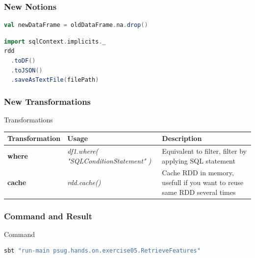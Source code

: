 \documentclass[slidetop,9pt,utf8]{beamer}
\begin{document}
\begin{CJK}{UTF8}{gbsn}
\begin{frame}[fragile]
\end{frame}

\begin{frame}[fragile]
  \frametitle{New Notions}

  \begin{lstlisting}[label=DropNullValue, caption=Drop rows containing null values, language=scala, style=code]
val newDataFrame = oldDataFrame.na.drop()
  \end{lstlisting}

  \begin{lstlisting}[label=SaveJsonFile, caption=Save RDD to JSON File, language=scala, style=code]
import sqlContext.implicits._
rdd
  .toDF()
  .toJSON()
  .saveAsTextFile(filePath)
  \end{lstlisting}

\end{frame}

\begin{frame}

  \frametitle{New Transformations}

  \begin{block}{Transformations}
    \begin{center}
      \begin{tabular}{|m{2.1cm}|m{3.5cm}|m{5cm}|}
        \hline 
        \rowcolor{gray} \textbf{Transformation} & \textbf{Usage} & \textbf{Description} \\ \hline
        \textbf{where} & \textit{df1.where( \newline  "SQLConditionStatement" \newline )} & Equivalent to filter, filter by applying SQL statement \\ \hline
        \textbf{cache} & \textit{rdd.cache()} & Cache RDD in memory, usefull if you want to reuse same RDD several times \\ \hline
      \end{tabular}
    \end{center}
  \end{block}

\end{frame}

\begin{frame}[fragile]
  \frametitle{Command and Result}

  \begin{block}{Command}
    \begin{lstlisting}[language=bash, style=terminal-medium]
sbt "run-main psug.hands.on.exercise05.RetrieveFeatures"
    \end{lstlisting}
  \end{block}


\end{frame}
\end{CJK}
\end{document}
